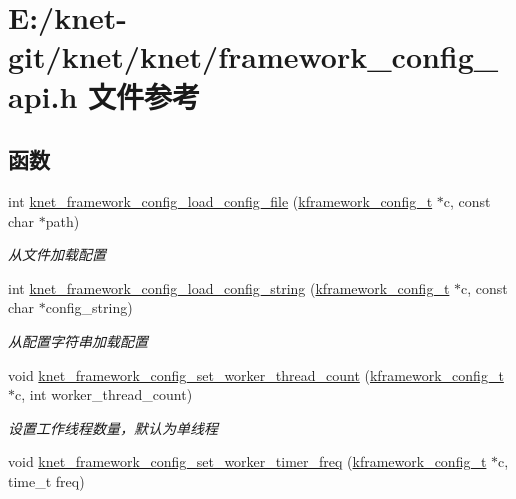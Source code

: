 \hypertarget{a00062}{}\section{E\+:/knet-\/git/knet/knet/framework\+\_\+config\+\_\+api.h 文件参考}
\label{a00062}
\subsection*{函数}
\begin{DoxyCompactItemize}
\item 
int \hyperlink{a00115_ga45b64d2f395031b60dd33412f55242b4_ga45b64d2f395031b60dd33412f55242b4}{knet\+\_\+framework\+\_\+config\+\_\+load\+\_\+config\+\_\+file} (\hyperlink{a00056_adeaf952e0f0887507ff836385bf54874_adeaf952e0f0887507ff836385bf54874}{kframework\+\_\+config\+\_\+t} $\ast$c, const char $\ast$path)
\begin{DoxyCompactList}\small\item\em 从文件加载配置 \end{DoxyCompactList}\item 
int \hyperlink{a00115_gad468ed615a958baef04c26eb8fe53efd_gad468ed615a958baef04c26eb8fe53efd}{knet\+\_\+framework\+\_\+config\+\_\+load\+\_\+config\+\_\+string} (\hyperlink{a00056_adeaf952e0f0887507ff836385bf54874_adeaf952e0f0887507ff836385bf54874}{kframework\+\_\+config\+\_\+t} $\ast$c, const char $\ast$config\+\_\+string)
\begin{DoxyCompactList}\small\item\em 从配置字符串加载配置 \end{DoxyCompactList}\item 
void \hyperlink{a00115_ga470f4acf8c70060852d435753375fa3b_ga470f4acf8c70060852d435753375fa3b}{knet\+\_\+framework\+\_\+config\+\_\+set\+\_\+worker\+\_\+thread\+\_\+count} (\hyperlink{a00056_adeaf952e0f0887507ff836385bf54874_adeaf952e0f0887507ff836385bf54874}{kframework\+\_\+config\+\_\+t} $\ast$c, int worker\+\_\+thread\+\_\+count)
\begin{DoxyCompactList}\small\item\em 设置工作线程数量，默认为单线程 \end{DoxyCompactList}\item 
void \hyperlink{a00115_ga42497b09d9d0c4039a062ff750ead0a9_ga42497b09d9d0c4039a062ff750ead0a9}{knet\+\_\+framework\+\_\+config\+\_\+set\+\_\+worker\+\_\+timer\+\_\+freq} (\hyperlink{a00056_adeaf952e0f0887507ff836385bf54874_adeaf952e0f0887507ff836385bf54874}{kframework\+\_\+config\+\_\+t} $\ast$c, time\+\_\+t freq)

\end{DoxyCompactItemize}
